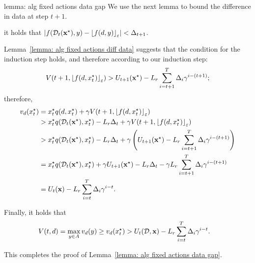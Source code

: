\begin{proofof}{lemma: alg fixed actions data gap}
We use the next lemma to bound the difference in data at step $t+1$.

\begin{lemma} \label{lemma: alg fixed actions diff data}
it holds that $\left| f(\mathcal{D}_t({\bf{x}}^\star), y) - {\left\lfloor f(d, y)\right\rfloor_{\varepsilon}} \right| < \Delta_{t+1}$.
\end{lemma}

Lemma~\ref{lemma: alg fixed actions diff data} suggests that the condition for the induction step holds, and therefore according to our induction step:
\begin{align*}
V(t+1,{\left\lfloor f(d, x^\star_t)\right\rfloor_{\varepsilon}}) > U_{t+1}({\bf{x}}^\star) - L_r\sum_{i = t+1}^T \Delta_i \gamma^{i - (t+1)};
\end{align*}
therefore,
\begin{align*}
v_d(x^\star_t) &= x^\star_t q(d, x^\star_t) + \gamma V(t+1,{\left\lfloor f(d, x^\star_t)\right\rfloor_{\varepsilon}}) \\
&> x^\star_t q(\mathcal{D}_t({\bf{x}}^\star), x^\star_t) - L_r \Delta_t + \gamma V(t+1,{\left\lfloor f(d, x^\star_t)\right\rfloor_{\varepsilon}}) \\
&> x^\star_t q(\mathcal{D}_t({\bf{x}}^\star), x^\star_t) - L_r \Delta_t + \gamma \left( U_{t+1}({\bf{x}}^\star) - L_r \sum_{i = t+1}^T \Delta_i \gamma^{i - (t+1)} \right) \\
&= x^\star_t q(\mathcal{D}_t({\bf{x}}^\star), x^\star_t) + \gamma U_{t+1}({\bf{x}}^\star) - L_r \Delta_t - \gamma L_r \sum_{i = t+1}^T \Delta_i \gamma^{i - (t+1)} \\
&= U_t({\bf{x}}) - L_r \sum_{i = t}^T \Delta_i \gamma^{i - t}.
\end{align*}

Finally, it holds that
\begin{align*}
V(t,d) &= \max_{y \in A} v_d(y) \geq v_d(x_t^\star) > U_t(\mathcal{D}, {\bf{x}}) - L_r \sum_{i = t}^T \Delta_i \gamma^{i-t}.
\end{align*}

This completes the proof of Lemma~\ref{lemma: alg fixed actions data gap}.
\end{proofof}


